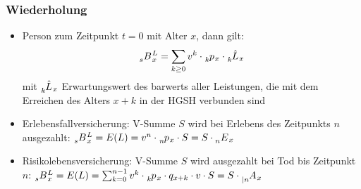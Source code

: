 \documentclass[12pt]{report}
\theoremstyle{dotless}
\theoremstyle{definition}
\begin{document}
\subsubsection{Wiederholung}
\begin{itemize}
\item Person zum Zeitpunkt $t=0$ mit Alter $x$, dann gilt:
\begin{equation}
\tensor[_{s}]{B}{}_x^L = \sum_{k\geq 0} v^k \cdot \tensor[_k]{p}{}_x \cdot \tensor[_k]{\hat{L}}{}_x
\end{equation}
mit $\tensor[_k]{\hat{L}}{}_x$ Erwartungswert des barwerts aller Leistungen, die mit dem Erreichen des Alters $x+k$ in der HGSH verbunden sind

\item Erlebensfallversicherung: V-Summe $S$ wird bei Erlebens des Zeitpunkts $n$ ausgezahlt: $\tensor[_{s}]{B}{}_x^L = E(L) = v^n \cdot \tensor[_n]{p}{}_x\cdot S = S \cdot \tensor[_n]{E}{}_x$
\item Risikolebensversicherung: V-Summe $S$ wird ausgezahlt bei Tod bis Zeitpunkt $n$: $\tensor[_{s}]{B}{}_x^L = E(L) = \sum_{k=0}^{n-1} v^k \cdot \tensor[_k]{p}{}_x \cdot q_{x+k} \cdot v \cdot S = S \cdot \tensor[_{|n}]{A}{}_x$
\end{itemize}
\end{document}
